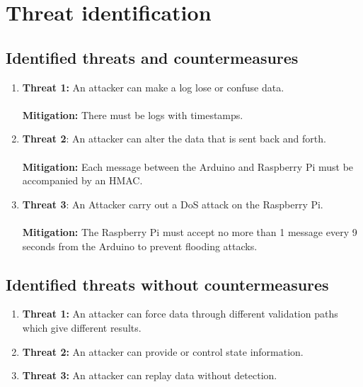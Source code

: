 \section{Threat identification}
\label{chapter3}

\subsection{Identified threats and countermeasures}

	\begin{enumerate}
		\item  \textbf{Threat 1:}
            An attacker can make a log lose or confuse data. \\ \\         
             \textbf{Mitigation:}
            There must be logs with timestamps.
		\item \textbf{Threat 2}:
            An attacker can alter the data that is sent back and forth.\\ \\
            \textbf{Mitigation:}
            Each message between the Arduino and Raspberry Pi must be accompanied by an HMAC.
		\item \textbf{Threat 3}:
            An Attacker carry out a DoS attack on the Raspberry Pi.\\ \\
            \textbf{Mitigation:}
            The Raspberry Pi must accept no more than 1 message every 9 seconds from the Arduino to prevent flooding attacks.	\end{enumerate}
	
\subsection{Identified threats without countermeasures}

	\begin{enumerate}
		\item \textbf{Threat 1:} 
            An attacker can force data through different validation paths which give different results. 
		\item \textbf{Threat 2:}
            An attacker can provide or control state information.
		\item \textbf{Threat 3:}
            An attacker can replay data without detection.            
	\end{enumerate}